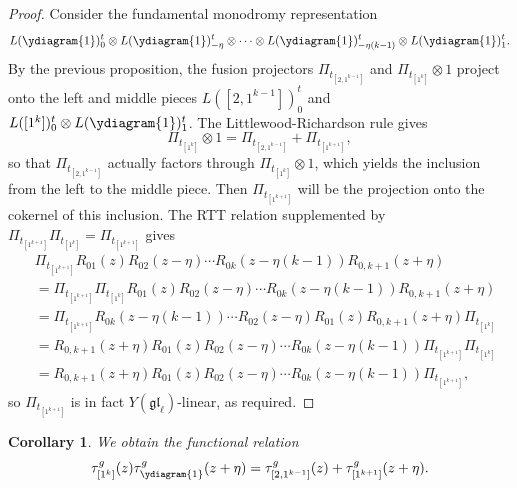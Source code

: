 \documentclass[11pt]{report}
\newtheorem{corollary}[theorem]{Corollary}
\theoremstyle{definition}
\theoremstyle{remark}
\theoremstyle{remark}
\begin{document}
\begin{proof}
Consider the fundamental monodromy representation
\begin{equation*}
L(\ydiagram{1})_0^t \otimes L(\ydiagram{1})_{-\eta}^t \otimes \cdots \otimes L(\ydiagram{1})_{-\eta(k-1)}^t \otimes L(\ydiagram{1})_1^t.
\end{equation*}
By the previous proposition, the fusion projectors $\Pi_{t_{[2,1^{k-1}]}}$ and $\Pi_{t_{[1^k]}} \otimes 1$ project onto the left and middle pieces $L([2,1^{k-1}])_0^t$ and $L([1^k])_0^t \otimes L(\ydiagram{1})_1^t$. The Littlewood-Richardson rule gives
\begin{equation*}
\Pi_{t_{[1^k]}} \otimes 1 = \Pi_{t_{[2,1^{k-1}]}} + \Pi_{t_{[1^{k+1}]}},
\end{equation*}
so that $\Pi_{t_{[2,1^{k-1}]}}$ actually factors through $\Pi_{t_{[1^k]}} \otimes 1$, which yields the inclusion from the left to the middle piece. Then $\Pi_{t_{[1^{k+1}]}}$ will be the projection onto the cokernel of this inclusion. The RTT relation supplemented by $\Pi_{t_{[1^{k+1}]}} \Pi_{t_{[1^k]}} = \Pi_{t_{[1^{k+1}]}}$ gives
\begin{align*}
&\Pi_{t_{[1^{k+1}]}} R_{01}(z) R_{02}(z-\eta) \cdots R_{0k}(z-\eta(k-1)) R_{0,k+1}(z+\eta) \\
&= \Pi_{t_{[1^{k+1}]}} \Pi_{t_{[1^k]}} R_{01}(z) R_{02}(z-\eta) \cdots R_{0k}(z-\eta(k-1)) R_{0,k+1}(z+\eta) \\
&= \Pi_{t_{[1^{k+1}]}} R_{0k}(z-\eta(k-1)) \cdots R_{02}(z-\eta) R_{01}(z) R_{0,k+1}(z+\eta) \Pi_{t_{[1^k]}} \\
&= R_{0,k+1}(z+\eta) R_{01}(z) R_{02}(z-\eta) \cdots R_{0k}(z-\eta(k-1)) \Pi_{t_{[1^{k+1}]}} \Pi_{t_{[1^k]}} \\
&= R_{0,k+1}(z+\eta) R_{01}(z) R_{02}(z-\eta) \cdots R_{0k}(z-\eta(k-1)) \Pi_{t_{[1^{k+1}]}},
\end{align*}
so $\Pi_{t_{[1^{k+1}]}}$ is in fact $Y(\mathfrak{gl}_\ell)$-linear, as required.
\end{proof}

\begin{corollary}
We obtain the functional relation
\begin{equation}\label{equation:functionalRelation}
\tau_{[1^k]}^g(z) \tau_{\ydiagram{1}}^g(z+\eta) = \tau_{[2,1^{k-1}]}^g(z) + \tau_{[1^{k+1}]}^g(z+\eta).
\end{equation}
\end{corollary}
\end{document}
